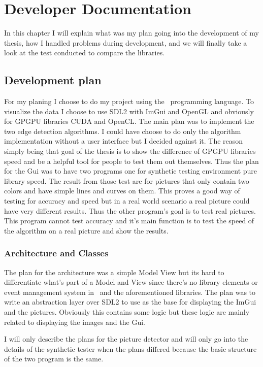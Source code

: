 \chapter{Developer Documentation}

In this chapter I will explain what was my plan going into the development of my thesis, how I handled problems during development, and we will finally take a look at the test conducted to compare the libraries.

\section{Development plan}

For my planing I choose to do my project using the \CC\ programming language. To visualize the data I choose to use \ac{SDL2} with \ac{ImGui} and OpenGL and obviously for \ac{GPGPU} libraries CUDA and OpenCL. The main plan was to implement the two edge detection algorithms. I could have choose to do only the algorithm implementation without a user interface but I decided against it. The reason simply being that goal of the thesis is to show the difference of \ac{GPGPU} libraries speed and be a helpful tool for people to test them out themselves. Thus the plan for the Gui was to have two programs one for synthetic testing environment pure library speed. The result from those test are for pictures that only contain two colors and have simple lines and curves on them. This proves a good way of testing for accuracy and speed but in a real world scenario a real picture could have very different results. Thus the other program's goal is to test real pictures. This program cannot test accuracy and it's main function is to test the speed of the algorithm on a real picture and show the results.


\subsection{Architecture and Classes}

The plan for the architecture was a simple Model View but its hard to differentiate what's part of a Model and View since there's no library elements or event management system in \CC\ and the aforementioned libraries. The plan was to write an abstraction layer over \ac{SDL2} to use as the base for displaying the \ac{ImGui} and the pictures. Obviously this contains some logic but these logic are mainly related to displaying the images and the Gui.

I will only describe the plans for the picture detector and will only go into the details of the synthetic tester when the plans differed because the basic structure of the two program is the same.

